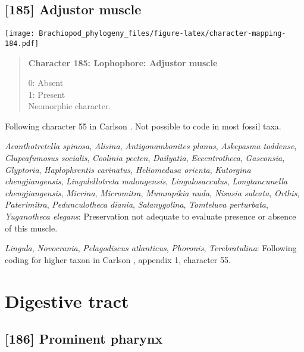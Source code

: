 \documentclass[openany]{book}
\theoremstyle{definition}
\theoremstyle{definition}
\theoremstyle{definition}
\theoremstyle{remark}
\begin{document}
\subsection*{{[}185{]} Adjustor muscle}\label{adjustor-muscle}

\texttt{[image: Brachiopod\_phylogeny\_files/figure-latex/character-mapping-184.pdf]}

\begin{quote}
\textbf{Character 185: Lophophore: Adjustor muscle}

0: Absent\\
1: Present\\
Neomorphic character.
\end{quote}

Following character 55 in Carlson
\citeyearpar{Carlson1995Phylogeneticrelationships}. Not possible to code
in most fossil taxa.

\hypertarget{Acanthotretella_spinosa-coding-185}{}
\emph{Acanthotretella spinosa}, \emph{Alisina}, \emph{Antigonambonites
planus}, \emph{Askepasma toddense}, \emph{Clupeafumosus socialis},
\emph{Coolinia pecten}, \emph{Dailyatia}, \emph{Eccentrotheca},
\emph{Gasconsia}, \emph{Glyptoria}, \emph{Haplophrentis carinatus},
\emph{Heliomedusa orienta}, \emph{Kutorgina chengjiangensis},
\emph{Lingulellotreta malongensis}, \emph{Lingulosacculus},
\emph{Longtancunella chengjiangensis}, \emph{Micrina},
\emph{Micromitra}, \emph{Mummpikia nuda}, \emph{Nisusia sulcata},
\emph{Orthis}, \emph{Paterimitra}, \emph{Pedunculotheca diania},
\emph{Salanygolina}, \emph{Tomteluva perturbata}, \emph{Yuganotheca
elegans}: Preservation not adequate to evaluate presence or absence of
this muscle.

\hypertarget{Lingula-coding-185}{}
\emph{Lingula}, \emph{Novocrania}, \emph{Pelagodiscus atlanticus},
\emph{Phoronis}, \emph{Terebratulina}: Following coding for higher taxon
in Carlson \citeyearpar{Carlson1995Phylogeneticrelationships}, appendix
1, character 55.

\section{Digestive tract}\label{digestive-tract}

\subsection*{{[}186{]} Prominent pharynx}\label{prominent-pharynx}
\end{document}
